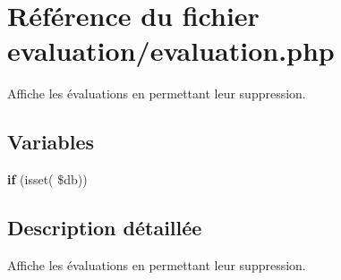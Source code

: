 \hypertarget{evaluation_8php}{}\section{Référence du fichier evaluation/evaluation.php}
\label{evaluation_8php}


Affiche les évaluations en permettant leur suppression.  


\subsection*{Variables}
\begin{DoxyCompactItemize}
\item 
\mbox{\label{evaluation_8php_a78139d27b05276de62db3d5c8dc71182}} 
{\bfseries if} (isset( \$db))
\end{DoxyCompactItemize}


\subsection{Description détaillée}
Affiche les évaluations en permettant leur suppression. 

